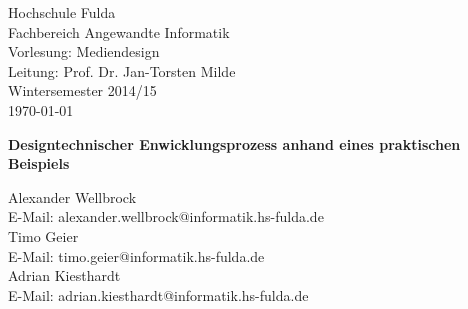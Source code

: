 
\begin{titlepage}

	\begin{small}
		\vfill {Hochschule Fulda\\
		Fachbereich Angewandte Informatik\\ 
		Vorlesung: Mediendesign\\
		Leitung: Prof. Dr. Jan-Torsten Milde\\
		Wintersemester 2014/15 \\
		\today}
	\end{small}

	\begin{center}
		\begin{Large}
			\vfill {\textsf{\textbf{
			Designtechnischer Enwicklungsprozess anhand eines praktischen Beispiels
			}}}
		\end{Large}
	\end{center}

	\begin{small}
		\vfill Alexander Wellbrock\\ E-Mail: alexander.wellbrock@informatik.hs-fulda.de\\
		Timo Geier\\ E-Mail: timo.geier@informatik.hs-fulda.de\\
		Adrian Kiesthardt\\ E-Mail: adrian.kiesthardt@informatik.hs-fulda.de
	\end{small}

\end{titlepage}
